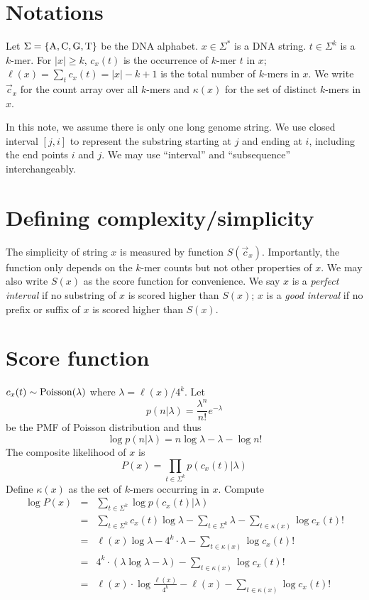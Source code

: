 \documentclass[10pt]{article}
\begin{document}
\section{Notations}

Let $\Sigma=\{{\rm A},{\rm C},{\rm G},{\rm T}\}$ be the DNA alphabet.
$x\in\Sigma^*$ is a DNA string.
$t\in\Sigma^k$ is a $k$-mer.
For $|x|\ge k$, $c_x(t)$ is the occurrence of $k$-mer $t$ in $x$;
$\ell(x)=\sum_t c_x(t)=|x|-k+1$ is the total number of $k$-mers in $x$.
We write $\vec{c}_x$ for the count array over all $k$-mers
and $\kappa(x)$ for the set of distinct $k$-mers in $x$.

In this note, we assume there is only one long genome string.
We use closed interval $[j,i]$ to represent the substring starting at $j$ and ending at $i$,
including the end points $i$ and $j$.
We may use ``interval'' and ``subsequence'' interchangeably.

\section{Defining complexity/simplicity}

The simplicity of string $x$ is measured by function $S(\vec{c}_x)$.
Importantly, the function only depends on the $k$-mer counts but not other properties of $x$.
We may also write $S(x)$ as the score function for convenience.
We say $x$ is a \emph{perfect interval} if no substring of $x$ is scored higher than $S(x)$;
$x$ is a \emph{good interval} if no prefix or suffix of $x$ is scored higher than $S(x)$.

\section{Score function}

$c_x(t)\sim{\rm Poisson}(\lambda)$
where $\lambda=\ell(x)/4^k$.
Let
$$
p(n|\lambda)=\frac{\lambda^n}{n!}e^{-\lambda}
$$
be the PMF of Poisson distribution and thus
$$
\log p(n|\lambda)=n\log\lambda-\lambda-\log n!
$$
The composite likelihood of $x$ is
$$
P(x)=\prod_{t\in\Sigma^k}p(c_x(t)|\lambda)
$$
Define $\kappa(x)$ as the set of $k$-mers occurring in $x$.
Compute
\begin{eqnarray*}
\log P(x)&=&\sum_{t\in\Sigma^k}\log p(c_x(t)|\lambda)\\
&=&\sum_{t\in\Sigma^k}c_x(t)\log\lambda-\sum_{t\in\Sigma^k}\lambda-\sum_{t\in\kappa(x)}\log c_x(t)!\\
&=&\ell(x)\log\lambda-4^k\cdot\lambda-\sum_{t\in\kappa(x)}\log c_x(t)!\\
&=&4^k\cdot(\lambda\log\lambda-\lambda)-\sum_{t\in\kappa(x)}\log c_x(t)!\\
&=&\ell(x)\cdot\log\frac{\ell(x)}{4^k}-\ell(x)-\sum_{t\in\kappa(x)}\log c_x(t)!
\end{eqnarray*}
\end{document}
